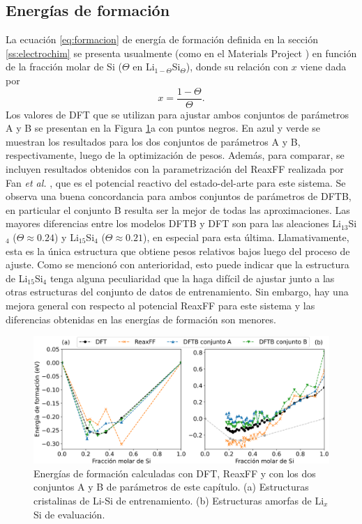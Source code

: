 \subsection{Energías de formación}

La ecuación \ref{eq:formacion} de energía de formación definida en la 
sección \ref{ss:electrochim} se presenta usualmente (como en el Materials 
Project \cite{materials_project}) en función de la fracción molar de Si 
($\Theta$ en Li$_{1-\Theta}$Si$_\Theta$), donde su relación con $x$ viene
dada por
\begin{equation}
	x = \frac{1 - \Theta}{\Theta}.
\end{equation}
Los valores de DFT que se utilizan para ajustar ambos conjuntos de parámetros
A y B se presentan en la Figura \ref{fig:eform}a con puntos negros. En azul
y verde se muestran los resultados para los dos conjuntos de parámetros A y B, respectivamente, 
luego de la optimización de pesos. Además, para comparar, se incluyen resultados
obtenidos con la parametrización del ReaxFF realizada por Fan \textit{et al.}
\cite{fan2013}, que es el potencial reactivo del estado-del-arte para este sistema. 
Se observa una buena concordancia para ambos conjuntos de parámetros
de DFTB, en particular el conjunto B resulta ser la mejor de todas las
aproximaciones. Las mayores diferencias entre los modelos DFTB y DFT son para las
aleaciones Li$_{13}$Si$_4$ ($\Theta \approx 0.24$) y Li$_{15}$Si$_4$
($\Theta \approx 0.21$), en especial para esta última. Llamativamente, esta es
la única estructura que obtiene pesos relativos bajos luego del proceso de
ajuste. Como se mencionó con anterioridad, esto puede indicar que la estructura
de Li$_{15}$Si$_4$ tenga alguna peculiaridad que la haga difícil de ajustar
junto a las otras estructuras del conjunto de datos de entrenamiento. Sin
embargo, hay una mejora general con respecto al potencial ReaxFF para este
sistema y las diferencias obtenidas en las energías de formación son menores.
\begin{figure}[h!]
	\centering
	\includegraphics[width=\textwidth]{Silicio/modelo/resultados/formacion/energias.png}
	\caption{Energías de formación calculadas con DFT, ReaxFF y con los dos
	conjuntos A y B de parámetros de este capítulo. (a) Estructuras cristalinas
	de Li-Si de entrenamiento. (b) Estructuras amorfas de Li$_x$Si de evaluación.}
	\label{fig:eform}
\end{figure}

